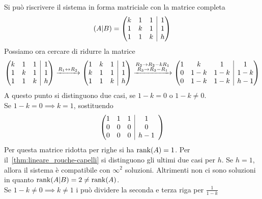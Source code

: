 Si può riscrivere il sistema in forma matriciale con la matrice completa
\begin{equation*}
  (A\vert B) =
  \left(
    \begin{array}{@{}ccc|c@{}}
    k & 1 & 1 & 1\\
    1 & k & 1 & 1\\
    1 & 1 & k & h
    \end{array}
  \right)
\end{equation*}
Possiamo ora cercare di ridurre la matrice
\begin{equation*}
  \left(
    \begin{array}{@{}ccc|c@{}}
    k & 1 & 1 & 1\\
    1 & k & 1 & 1\\
    1 & 1 & k & h
    \end{array}
  \right) \xrightarrow{R_1\leftrightarrow R_2}
  \left(
    \begin{array}{@{}ccc|c@{}}
    1 & k & 1 & 1\\
    k & 1 & 1 & 1\\
    1 & 1 & k & h
    \end{array}
  \right) \xrightarrow{\substack{R_2\to R_2-kR_1\\ R_3\to R_3-R_1}}
  \left(
    \begin{array}{@{}ccc|c@{}}
    1 & k & 1 & 1\\
    0 & 1-k & 1-k & 1-k\\
    0 & 1-k & 1-k & h-1
    \end{array}
  \right)
\end{equation*}
A questo punto si distinguono due casi, se $1-k = 0$ o $1-k\neq0$.\\
Se $1-k=0\implies k=1$, sostituendo
\begin{equation*}
  \left(
    \begin{array}{@{}ccc|c}
    1 & 1 & 1 & 1\\
    0 & 0 & 0 & 0\\
    0 & 0 & 0 & h-1
    \end{array}
  \right)
\end{equation*}
Per questa matrice ridotta per righe si ha $\rank(A)=1$. Per
il~\autoref{thm:lineare_rouche-capelli} si distinguono gli ultimi due casi per $h$. Se
$h=1$, allora il sistema è compatibile con $\infty^2$ soluzioni. Altrimenti non ci sono
soluzioni in quanto $\rank(A\vert B) = 2 \neq \rank(A)$.\\
Se $1-k\neq0\implies k\neq1$ i può dividere la seconda e terza riga per $\frac{1}{1-k}$
